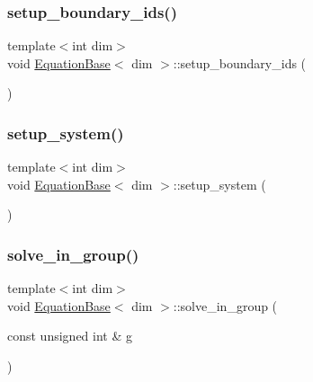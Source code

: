 \mbox{\label{class_equation_base_aeeac77cdccc1907fe6e53b27e614ee86}} 
\subsubsection{\texorpdfstring{setup\+\_\+boundary\+\_\+ids()}{setup\_boundary\_ids()}}
{\footnotesize\ttfamily template$<$int dim$>$ \\
void \hyperlink{class_equation_base}{Equation\+Base}$<$ dim $>$\+::setup\+\_\+boundary\+\_\+ids (\begin{DoxyParamCaption}{ }\end{DoxyParamCaption})\hspace{0.3cm}{\ttfamily [private]}}

\mbox{\label{class_equation_base_af47f226b1564534307552d7d4e72a54d}} 
\subsubsection{\texorpdfstring{setup\+\_\+system()}{setup\_system()}}
{\footnotesize\ttfamily template$<$int dim$>$ \\
void \hyperlink{class_equation_base}{Equation\+Base}$<$ dim $>$\+::setup\+\_\+system (\begin{DoxyParamCaption}{ }\end{DoxyParamCaption})\hspace{0.3cm}{\ttfamily [private]}}

\mbox{\label{class_equation_base_a591282eb0ced01a7f22e29e7f0f44129}} 
\subsubsection{\texorpdfstring{solve\+\_\+in\+\_\+group()}{solve\_in\_group()}}
{\footnotesize\ttfamily template$<$int dim$>$ \\
void \hyperlink{class_equation_base}{Equation\+Base}$<$ dim $>$\+::solve\+\_\+in\+\_\+group (\begin{DoxyParamCaption}\item[{const unsigned int \&}]{g }\end{DoxyParamCaption})\hspace{0.3cm}{\ttfamily [virtual]}}



